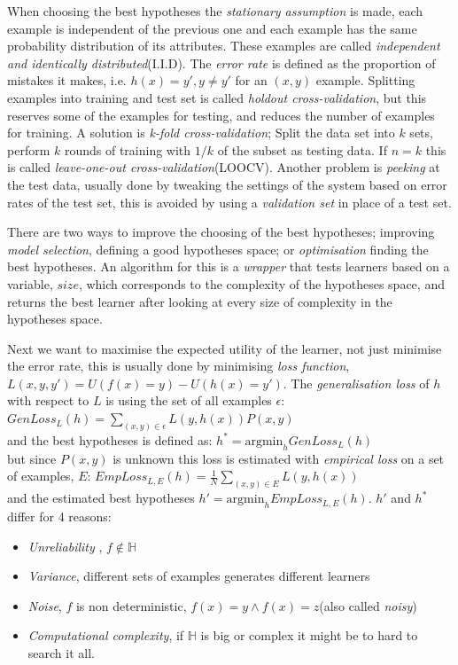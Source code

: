 \documentclass[11pt, letterpaper]{report}
\numberwithin{equation}{section}
\begin{document}
When choosing the best hypotheses the \emph{stationary assumption} is made, each
example is independent of the previous one and each example has the same
probability distribution of its attributes. These examples are called
\emph{independent and identically distributed}(I.I.D). The \emph{error rate} is
defined as the proportion of mistakes it makes, i.e. $h(x) = y', y \neq y'$ for
an $(x,y)$ example. Splitting examples into training and test set is called
\emph{holdout cross-validation}, but this reserves some of the examples for
testing, and reduces the number of examples for training. A solution is
\emph{k-fold cross-validation}; Split the data set into $k$ sets, perform $k$
rounds of training with $1/k$ of the subset as testing data. If $n=k$ this is
called \emph{leave-one-out cross-validation}(LOOCV). Another problem is
\emph{peeking} at the test data, usually done by tweaking the settings of the
system based on error rates of the test set, this is avoided by using a
\emph{validation set} in place of a test set.

There are two ways to improve the choosing of the best hypotheses; improving
\emph{model selection}, defining a good hypotheses space; or \emph{optimisation}
finding the best hypotheses. An algorithm for this is a \emph{wrapper} that
tests learners based on a variable, $size$, which corresponds to the complexity
of the hypotheses space, and returns the best learner after looking at every
size of complexity in the hypotheses space.

Next we want to maximise the expected utility of the learner, not just minimise
the error rate, this is usually done by minimising \emph{loss function},
$L(x,y,y') = U(f(x)=y) - U(h(x)=y')$. The \emph{generalisation loss} of $h$ with
respect to $L$ is using the set of all examples $\epsilon$: $GenLoss_L(h) =
\sum_{(x,y) \in \epsilon} L(y,h(x))P(x,y)$ \\
and the best hypotheses is defined as: $h^\ast = \text{argmin}_h GenLoss_L(h)$
\\
but since $P(x,y)$ is unknown this loss is estimated with \emph{empirical loss}
on a set of examples, $E$: $EmpLoss_{L,E}(h) = \frac{1}{N} \sum_{(x,y) \in E}
L(y,h(x))$ \\ and the estimated best hypotheses $h' = \text{argmin}_h
EmpLoss_{L,E}(h)$. $h'$ and $h^\ast$ differ for 4 reasons:
\begin{itemize}
\item \emph{ Unreliability }, $f \notin \mathbb{H}$
\item \emph{Variance}, different sets of examples generates different learners
\item \emph{Noise}, $f$ is non deterministic, $f(x) = y \wedge f(x) = z$(also called \emph{noisy})
\item \emph{Computational complexity}, if $\mathbb{H}$ is big or complex it might be to
  hard to search it all.
\end{itemize}
\end{document}
